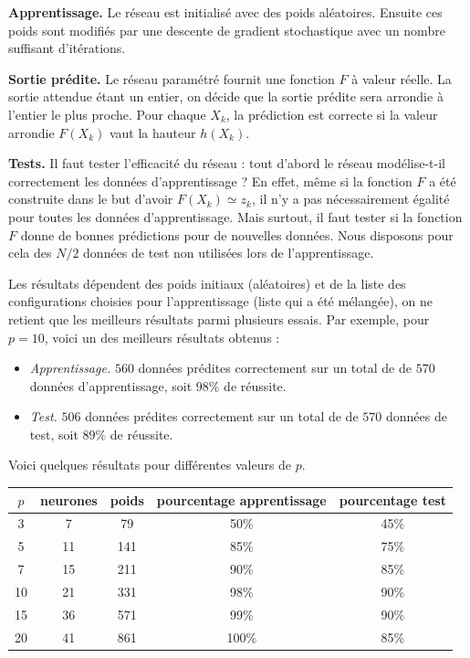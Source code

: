 

\textbf{Apprentissage.}
Le réseau est initialisé avec des poids aléatoires. Ensuite ces poids sont modifiés par une descente de gradient stochastique avec un nombre suffisant d'itérations.

\textbf{Sortie prédite.}
Le réseau paramétré fournit une fonction $F$ à valeur réelle. La sortie attendue étant un entier, on décide que la sortie prédite sera arrondie à l'entier le plus proche.
Pour chaque $X_k$, la prédiction est correcte si la valeur arrondie $F(X_k)$ vaut la hauteur $h(X_k)$. 


\textbf{Tests.}
Il faut tester l'efficacité du réseau : tout d'abord le réseau modélise-t-il correctement les données d'apprentissage ? En effet, même si la fonction $F$ a été construite dans le but d'avoir $F(X_k) \simeq z_k$, il n'y a pas nécessairement égalité pour toutes les données d'apprentissage. Mais surtout, il faut tester si la fonction $F$ donne de bonnes prédictions pour de nouvelles données. Nous disposons pour cela des $N/2$ données de test non utilisées lors de l'apprentissage.

Les résultats dépendent des poids initiaux (aléatoires) et de la liste des configurations choisies pour l'apprentissage (liste qui a été mélangée), on ne retient que les meilleurs résultats parmi plusieurs essais.
Par exemple, pour $p=10$, voici un des meilleurs résultats obtenus :
\begin{itemize}
	\item \emph{Apprentissage.} $560$ données prédites correctement sur un total de de $570$ données d'apprentissage, soit $98\%$ de réussite.
	
	\item \emph{Test.} $506$ données prédites correctement sur un total de de $570$ données de test, soit $89\%$ de réussite.
\end{itemize}

Voici quelques résultats pour différentes valeurs de $p$.

\begin{center}
	\begin{tabular}{c|c|c|c|c}
		$p$ & {neurones} & {poids} & {pourcentage apprentissage} & {pourcentage test} \\ \hline
		3 & 7 & 79 & 50\% & 45\% \\
		5 & 11 & 141 & 85\% & 75\% \\
		7 & 15 & 211 & 90\% & 85\% \\
		10 & 21 & 331 & 98\% & 90\% \\
		15 & 36 & 571 & 99\% & 90\% \\
		20 & 41 & 861 & 100\% & 85\% \\
	\end{tabular}
\end{center}

